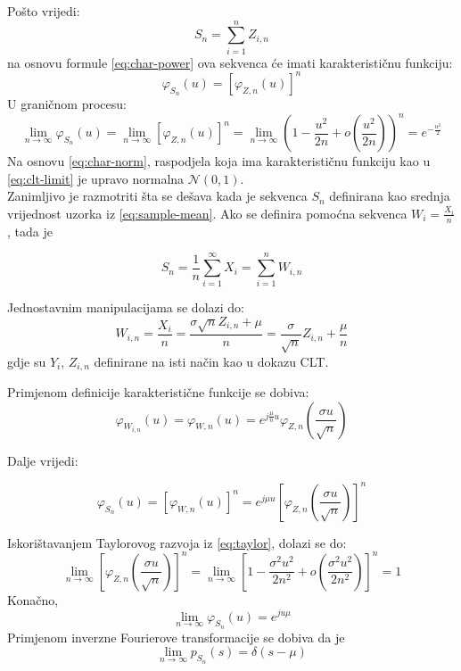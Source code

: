 Pošto vrijedi:
\begin{equation}
  S_n = \sum_{i=1}^{n} Z_{i,n}
\end{equation}
na osnovu formule \eqref{eq:char-power} ova sekvenca će imati karakterističnu
funkciju:
\begin{equation}
  \varphi_{S_n}(u) = \left[\varphi_{Z,n}(u)\right]^n
\end{equation}
U graničnom procesu:
\begin{equation} \label{eq:clt-limit}
  \lim_{n\to\infty} \varphi_{S_n}(u)
  = \lim_{n\to\infty} [\varphi_{Z,n}(u)]^n
  = \lim_{n\to\infty}
    \left(1 - \frac{u^2}{2n} + o\left(\frac{u^2}{2n}\right)\right)^n
    = e^{-\frac{u^2}{2}}
\end{equation}
Na osnovu \eqref{eq:char-norm}, raspodjela koja ima karakterističnu funkciju kao
u \eqref{eq:clt-limit} je upravo normalna $\mathcal{N}(0,1)$. \blacksquare \\

Zanimljivo je razmotriti šta se dešava kada je sekvenca $S_n$ definirana kao
srednja vrijednost uzorka iz \eqref{eq:sample-mean}. Ako se definira pomoćna
sekvenca $W_i = \frac{X_i}{n}$, tada je

\begin{equation}
  S_n = \frac{1}{n}\sum_{i=1}^{\infty} X_i = \sum_{i=1}^{n} W_{i,n}
\end{equation}

Jednostavnim manipulacijama se dolazi do:
\begin{equation}
  W_{i,n} = \frac{X_i}{n} = \frac{\sigma \sqrt{n} Z_{i,n}+\mu}{n}
  = \frac{\sigma}{\sqrt{n}} Z_{i,n} + \frac{\mu}{n}
\end{equation}
gdje su $Y_i$, $Z_{i,n}$ definirane na isti način kao u dokazu CLT.

Primjenom definicije karakteristične funkcije se dobiva:
\begin{equation}
  \varphi_{W_{i,n}}(u) = \varphi_{W,n}(u)
  = e^{j\frac{\mu}{n} u} \varphi_{Z,n}\left(\frac{\sigma u}{\sqrt{n}}\right)
\end{equation}

Dalje vrijedi:

\begin{equation}
  \varphi_{S_n}(u) = [\varphi_{W,n}(u)]^n
  = e^{j\mu u} \left[\varphi_{Z,n}\left(\frac{\sigma u}{\sqrt{n}}\right)\right]^n
\end{equation}

Iskorištavanjem Taylorovog razvoja iz \eqref{eq:taylor}, dolazi se do:
\begin{equation}
  \lim_{n\to\infty}
    \left[\varphi_{Z,n}\left(\frac{\sigma u}{\sqrt{n}}\right)\right]^n
    = \lim_{n\to\infty} \left[1-\frac{\sigma^2u^2}{2n^2} +
      o\left(\frac{\sigma^2u^2}{2n^2}\right)\right]^n
    = 1
\end{equation}
Konačno,
\begin{equation}
  \lim_{n\to\infty} \varphi_{S_n}(u) = e^{ju\mu}
\end{equation}
Primjenom inverzne Fourierove transformacije se dobiva da je
\begin{equation}
  \lim_{n\to\infty} p_{S_n}(s) = \delta(s-\mu)
\end{equation}

